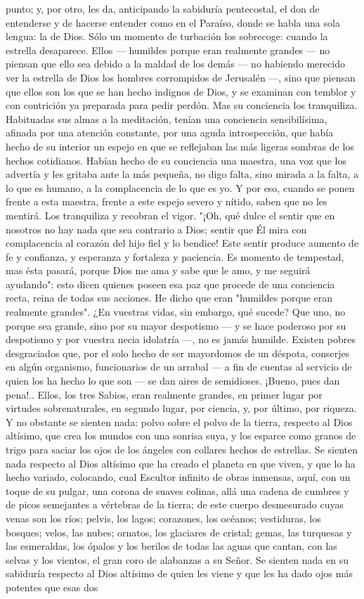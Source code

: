 \documentclass[12pt]{book} %
\begin{document}
punto; y, por otro, les da, anticipando la sabiduría pentecostal, el don de entenderse y de hacerse entender como en el Paraíso, donde se habla una sola lengua: la de Dios. Sólo un momento de turbación los sobrecoge: cuando la estrella desaparece. Ellos — humildes porque eran realmente grandes — no piensan que ello sea debido a la maldad de los demás — no habiendo merecido ver la estrella de Dios los hombres corrompidos de Jerusalén —, sino que piensan que ellos son los que se han hecho indignos de Dios, y se examinan con temblor y con contrición ya preparada para pedir perdón. Mas su conciencia los tranquiliza. Habituadas sus almas a la meditación, tenían una conciencia sensibilísima, afinada por una atención constante, por una aguda introspección, que había hecho de su interior un espejo en que se reflejaban las más ligeras sombras de los hechos cotidianos. Habían hecho de su conciencia una maestra, una voz que los advertía y les gritaba ante la más pequeña, no digo falta, sino mirada a la falta, a lo que es humano, a la complacencia de lo que es yo. Y por eso, cuando se ponen frente a esta maestra, frente a este espejo severo y nítido, saben que no les mentirá. Los tranquiliza y recobran el vigor. "¡Oh, qué dulce el sentir que en nosotros no hay nada que sea contrario a Dios; sentir que Él mira con complacencia al corazón del hijo fiel y lo bendice! Este sentir produce aumento de fe y confianza, y esperanza y fortaleza y paciencia. Es momento de tempestad, mas ésta pasará, porque Dios me ama y sabe que le amo, y me seguirá ayudando": esto dicen quienes poseen esa paz que procede de una conciencia recta, reina de todas sus acciones. He dicho que eran "humildes porque eran realmente grandes". ¿En vuestras vidas, sin embargo, qué sucede? Que uno, no porque sea grande, sino por su mayor despotismo — y se hace poderoso por su despotismo y por vuestra necia idolatría —, no es jamás humilde. Existen pobres desgraciados que, por el solo hecho de ser mayordomos de un déspota, conserjes en algún organismo, funcionarios de un arrabal — a fin de cuentas al servicio de quien los ha hecho lo que son — se dan aires de semidioses. ¡Bueno, pues dan pena!.. Ellos, los tres Sabios, eran realmente grandes, en primer lugar por virtudes sobrenaturales, en segundo lugar, por ciencia, y, por último, por riqueza. Y no obstante se sienten nada: polvo sobre el polvo de la tierra, respecto al Dios altísimo, que crea los mundos con una sonrisa suya, y los esparce como granos de trigo para saciar los ojos de los ángeles con collares hechos de estrellas. Se sienten nada respecto al Dios altísimo que ha creado el planeta en que viven, y que lo ha hecho variado, colocando, cual Escultor infinito de obras inmensas, aquí, con un toque de su pulgar, una corona de suaves colinas, allá una cadena de cumbres y de picos semejantes a vértebras de la tierra; de este cuerpo desmesurado cuyas venas son los ríos; pelvis, los lagos; corazones, los océanos; vestiduras, los bosques; velos, las nubes; ornatos, los glaciares de cristal; gemas, las turquesas y las esmeraldas, los ópalos y los berilos de todas las aguas que cantan, con las selvas y los vientos, el gran coro de alabanzas a su Señor. Se sienten nada en su sabiduría respecto al Dios altísimo de quien les viene y que les ha dado ojos más potentes que esas dos 
\end{document}
